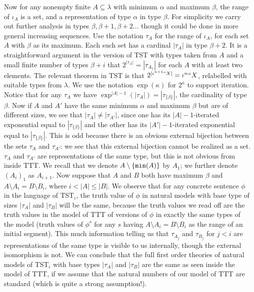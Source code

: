 \documentclass[112pt]{article}
\theoremstyle{definition}
\theoremstyle{remark}
\begin{document}
Now for any nonempty finite $A \subseteq \lambda$ with minimum $\alpha$ and maximum $\beta$, the range of $\iota_A$ is a set, and a representation of type $\alpha$ in
type $\beta$.  For simplicity we carry out further analysis in types $\beta, \beta+1,\beta+2\ldots$ though it could be done in more general increasing sequences.  Use the notation
$\tau_A$ for the range of $\iota_A$, for each set $A$ with $\beta$ as its maximum.  Each such set has a cardinal $|\tau_A|$ in type $\beta+2$.  It is a straightforward
argument in the version of TST with types taken from $A$ and a small finite number of types $\beta+i$ that $2^{|\tau_A|} = |\tau_{A_1}|$ for each $A$ with at least two elements.
The relevant theorem in TST is that $2^{|\iota^{n+1}``X|} = \iota^n``X$, relabelled with suitable types from $\lambda$.   We use the notation $\exp(\kappa)$ for $2^\kappa$ to support iteration.  Notice that for any $\tau_A$ we have $\exp^{|A|-1}(|\tau_A|) = |\tau_{\{\beta\}}|$, the cardinality of type $\beta$.   Now if $A$ and $A'$ have the same minimum $\alpha$ and maximum $\beta$
but are of different sizes, we see that $|\tau_A| \neq |\tau_{A'}|$, since one has its $|A|-1$-iterated exponential equal to $|\tau_{\{\beta\}}|$ and the other has its $|A'|-1$-iterated exponential equal to $|\tau_{\{\beta\}}|$.  This is odd because there is an obvious external bijection between the sets $\tau_A$ and $\tau_{A'}$:  we see that this external bijection cannot be realized as a set.  $\tau_A$ and $\tau_{A'}$ are representations of the same type, but this is not obvious from inside TTT.  We recall that we denote $A \setminus \{{\tt min}(A)\}$ by $A_1$;  we further denote $(A_i)_1$ as $A_{i+1}$.  Now suppose that $A$ and $B$ both have maximum $\beta$ and $A \setminus A_i = B \setminus B_i$, where $i<|A| \leq |B|$.
We observe that for any concrete sentence $\phi$  in the language of TST$_i$, the truth value of $\phi$ in natural models with base type of sizes $|\tau_A|$ and $|\tau_B|$ will be the same, because the truth values we read off are the truth values in the model of TTT of versions of $\phi$ in exactly the same types of the model (truth values of $\phi^s$ for
any $s$ having $A \setminus A_i = B\setminus B_i$ as the range of an initial segment).  This much information telling us that $\tau_{A_j}$ and $\tau_{B_j}$ for $j<i$ are representations of the same type  is visible to us internally, though the external isomorphism is not.  We can conclude that the full first order theories of natural models of TST$_i$ with base types $|\tau_A|$ and $|\tau_B|$ are
the same as seen inside the model of TTT, if we assume that the natural numbers of our model of TTT are standard (which is quite a strong assumption!).
\end{document}
